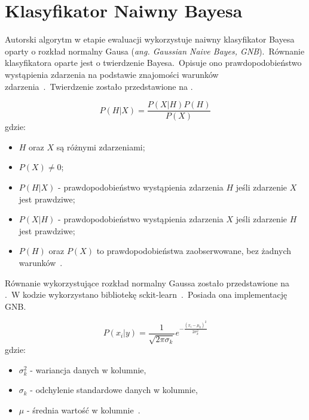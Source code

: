 \section{Klasyfikator Naiwny Bayesa}
Autorski algorytm w etapie ewaluacji wykorzystuje naiwny klasyfikator Bayesa oparty o rozkład normalny Gausa (\textit{ang. Gaussian Naive Bayes, GNB}).\ Równanie klasyfikatora oparte jest o twierdzenie Bayesa.\ Opisuje ono prawdopodobieństwo wystąpienia zdarzenia na podstawie znajomości warunków zdarzenia~\cite{Joyce2003}.\ Twierdzenie zostało przedstawione na .

\begin{equation}\label{math:bayes}
P(H|X) = \frac{P(X|H) P(H)}{P(X)}
\end{equation}
gdzie:
\begin{itemize}
    \item $H$ oraz $X$ są różnymi zdarzeniami;
    \item $P(X) \neq 0$;
    \item $P(H|X)$ - prawdopodobieństwo wystąpienia zdarzenia $H$ jeśli zdarzenie $X$ jest prawdziwe;
    \item $P(X|H)$ - prawdopodobieństwo wystąpienia zdarzenia $X$ jeśli zdarzenie $H$ jest prawdziwe;
    \item $P(H)$ oraz $P(X)$ to prawdopodobieństwa zaobserwowane, bez żadnych warunków~\cite{Leung2007}.
\end{itemize}

Równanie wykorzystujące rozkład normalny Gaussa zostało przedstawione na .\ W kodzie wykorzystano bibliotekę sckit-learn~\cite{scikit-learn}.\ Posiada ona implementację GNB.

\begin{equation}\label{math:gnb}
    P(x_{i}|y) = \frac{1}{\sqrt{2\pi\sigma_{k}}}e^{-\frac{(x_{i}-\mu_{k})^2}{2\sigma_{k}^{2}}}
\end{equation}
gdzie:
\begin{itemize}
        \item[] \textbf{$\sigma_{k}^{2}$} - wariancja danych w kolumnie,
        \item[] \textbf{$\sigma_{k}$} - odchylenie standardowe danych w kolumnie,
        \item[] \textbf{$\mu$} - średnia wartość w kolumnie~\cite{Leung2007}.
\end{itemize}
